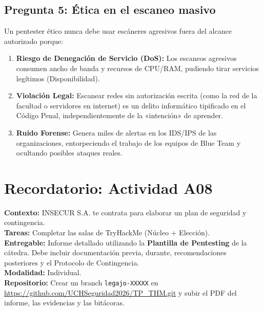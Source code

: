 \documentclass[11pt,a4paper]{article}
\begin{document}
\subsection*{Pregunta 5: Ética en el escaneo masivo}
\begin{respuesta}
Un pentester ético nunca debe usar escáneres agresivos fuera del alcance autorizado porque:
\begin{enumerate}
  \item \textbf{Riesgo de Denegación de Servicio (DoS):} Los escaneos agresivos consumen ancho de banda y recursos de CPU/RAM, pudiendo tirar servicios legítimos (Disponibilidad).
  \item \textbf{Violación Legal:} Escanear redes sin autorización escrita (como la red de la facultad o servidores en internet) es un delito informático tipificado en el Código Penal, independientemente de la «intención» de aprender.
  \item \textbf{Ruido Forense:} Genera miles de alertas en los IDS/IPS de las organizaciones, entorpeciendo el trabajo de los equipos de Blue Team y ocultando posibles ataques reales.
\end{enumerate}
\end{respuesta}

\section{Recordatorio: Actividad A08}
\begin{clave}
\textbf{Contexto:} INSECUR S.A. te contrata para elaborar un plan de seguridad y contingencia.\\
\textbf{Tareas:} Completar las salas de TryHackMe (Núcleo + Elección).\\
\textbf{Entregable:} Informe detallado utilizando la \textbf{Plantilla de Pentesting} de la cátedra. Debe incluir documentación previa, durante, recomendaciones posteriores y el Protocolo de Contingencia.\\
\textbf{Modalidad:} Individual.\\
\textbf{Repositorio:} Crear un branch \texttt{legajo-XXXXX} en \url{https://github.com/UCHSeguridad2026/TP_THM.git} y subir el PDF del informe, las evidencias y las bitácoras.
\end{clave}
\end{document}
